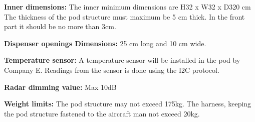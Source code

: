 \textbf{Inner dimensions:} The inner minimum dimensions are H32 x W32 x D320 cm
The thickness of the pod structure must maximum be  5 cm thick. In the front part it should be no more than 3cm. 

\textbf{Dispenser openings Dimensions:} 25 cm long and 10 cm wide.

\textbf{Temperature sensor:} A temperature sensor will be installed in the pod by Company E. Readings from the sensor is done using the I2C protocol.

\textbf{Radar dimming value:} Max 10dB 

\textbf{Weight limits:} The pod structure may not exceed 175kg. The harness, keeping the pod structure fastened to the aircraft man not exceed 20kg. 
